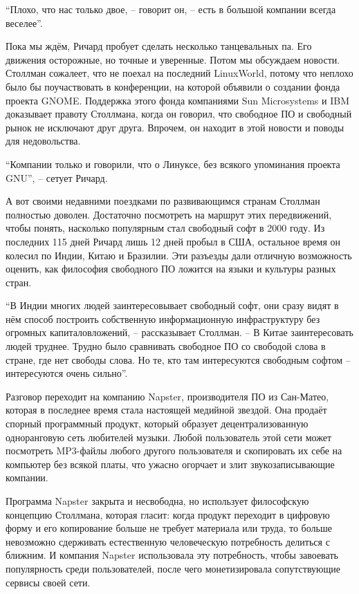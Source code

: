 \enquote{Плохо, что нас только двое, -- говорит он, -- есть в большой компании всегда веселее}.

Пока мы ждём, Ричард пробует сделать несколько танцевальных па. Его движения осторожные, но точные и уверенные. Потом мы обсуждаем новости. Столлман сожалеет, что не поехал на последний LinuxWorld, потому что неплохо было бы поучаствовать в конференции, на которой объявили о создании фонда проекта GNOME. Поддержка этого фонда компаниями Sun Microsystems и IBM доказывает правоту Столлмана, когда он говорил, что свободное ПО и свободный рынок не исключают друг друга. Впрочем, он находит в этой новости и поводы для недовольства.

\enquote{Компании только и говорили, что о Линуксе, без всякого упоминания проекта GNU}, -- сетует Ричард.

А вот своими недавними поездками по развивающимся странам Столлман полностью доволен. Достаточно посмотреть на маршрут этих передвижений, чтобы понять, насколько популярным стал свободный софт в 2000 году. Из последних 115 дней Ричард лишь 12 дней пробыл в США, остальное время он колесил по Индии, Китаю и Бразилии. Эти разъезды дали отличную возможность оценить, как философия свободного ПО ложится на языки и культуры разных стран.

\enquote{В Индии многих людей заинтересовывает свободный софт, они сразу видят в нём способ построить собственную информационную инфраструктуру без огромных капиталовложений, -- рассказывает Столлман. -- В Китае заинтересовать людей труднее. Трудно было сравнивать свободное ПО со свободой слова в стране, где нет свободы слова. Но те, кто там интересуются свободным софтом -- интересуются очень сильно}.

Разговор переходит на компанию Napster, производителя ПО из Сан-Матео, которая в последнее время стала настоящей медийной звездой. Она продаёт спорный программный продукт, который образует децентрализованную одноранговую сеть любителей музыки. Любой пользователь этой сети может посмотреть MP3-файлы любого другого пользователя и скопировать их себе на компьютер без всякой платы, что ужасно огорчает и злит звукозаписывающие компании.

Программа Napster закрыта и несвободна, но использует философскую концепцию Столлмана, которая гласит: когда продукт переходит в цифровую форму и его копирование больше не требует материала или труда, то больше невозможно сдерживать естественную человеческую потребность делиться с ближним. И компания Napster использовала эту потребность, чтобы завоевать популярность среди пользователей, после чего монетизировала сопутствующие сервисы своей сети.

